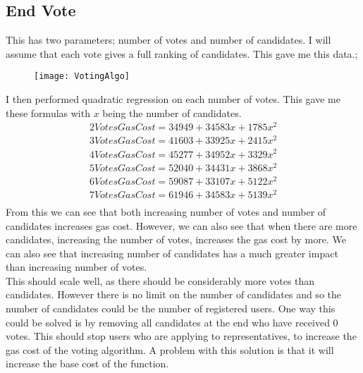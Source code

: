 \subsection{End Vote}
This has two parameters; number of votes and number of candidates. I will assume that each vote gives a full ranking of candidates. This gave me this data.;
\begin{figure}[H]
\texttt{[image: VotingAlgo]}
\end{figure}
I then performed quadratic regression on each number of votes. This gave me these formulas with $x$ being the number of candidates.
\begin{gather*}
2 Votes Gas Cost = 34949 + 34583x + 1785x^2 \\
3 Votes Gas Cost = 41603 + 33925x + 2415x^2 \\
4 Votes Gas Cost = 45277 + 34952x + 3329x^2 \\
5 Votes Gas Cost = 52040 + 34431x + 3868x^2 \\
6 Votes Gas Cost = 59087 + 33107x + 5122x^2 \\
7 Votes Gas Cost = 61946 + 34583x + 5139x^2 \\
\end{gather*}
From this we can see that both increasing number of votes and number of candidates increases gas cost. However, we can also see that when there are more candidates, increasing the number of votes, increases the gas cost by more. We can also see that increasing number of candidates has a much greater impact than increasing number of votes.\\
This should scale well, as there should be considerably more votes than candidates. However there is no limit on the number of candidates and so the number of candidates could be the number of registered users. One way this could be solved is by removing all candidates at the end who have received 0 votes. This should stop users who are applying to representatives, to increase the gas cost of the voting algorithm. A problem with this solution is that it will increase the base cost of the function.
